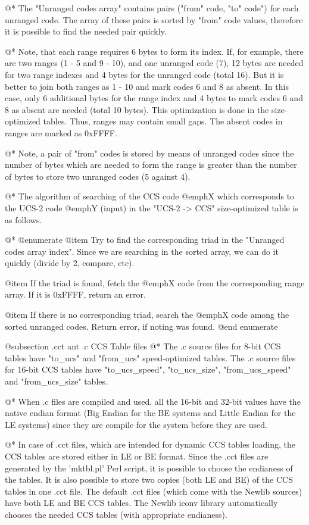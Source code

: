 @*
The "Unranged codes array" contains pairs ("from" code, "to" code") for
each unranged code. The array of these pairs is sorted by "from" code
values, therefore it is possible to find the needed pair quickly.

@*
Note, that each range requires 6 bytes to form its index. If, for
example, there are two ranges (1 - 5 and 9 - 10), and one unranged code
(7), 12 bytes are needed for two range indexes and 4 bytes for the unranged
code (total 16). But it is better to join both ranges as 1 - 10 and
mark codes 6 and 8 as absent. In this case, only 6 additional bytes for the
range index and 4 bytes to mark codes 6 and 8 as absent are needed
(total 10 bytes). This optimization is done in the size-optimized tables.
Thus, ranges may contain small gaps. The absent codes in ranges are marked
as 0xFFFF.

@*
Note, a pair of "from" codes is stored by means of unranged codes since
the number of bytes which are needed to form the range is greater than
the number of bytes to store two unranged codes (5 against 4).

@*
The algorithm of searching of the CCS code
@emph{X} which corresponds to the UCS-2 code @emph{Y} (input) in the "UCS-2 ->
CCS" size-optimized table is as follows.

@*
@enumerate
@item Try to find the corresponding triad in the "Unranged codes array
index". Since we are searching in the sorted array, we can do it quickly
(divide by 2, compare, etc).

@item If the triad is found, fetch the @emph{X} code from the corresponding
range array. If it is 0xFFFF, return an error.

@item If there is no corresponding triad, search the @emph{X} code among the
sorted unranged codes. Return error, if noting was found.
@end enumerate

@subsection .cct ant .c CCS Table files
@*
The .c source files for 8-bit CCS tables have "to_ucs" and "from_ucs"
speed-optimized tables. The .c source files for 16-bit CCS tables have
"to_ucs_speed", "to_ucs_size", "from_ucs_speed" and "from_ucs_size"
tables.

@*
When .c files are compiled and used, all the 16-bit and 32-bit values
have the native endian format (Big Endian for the BE systems and Little
Endian for the LE systems) since they are compile for the system before
they are used.

@*
In case of .cct files, which are intended for dynamic CCS tables
loading, the CCS tables are stored either in LE or BE format. Since the
.cct files are generated by the 'mktbl.pl' Perl script, it is possible
to choose the endianess of the tables. It is also possible to store two
copies (both LE and BE) of the CCS tables in one .cct file. The default
.cct files (which come with the Newlib sources) have both LE and BE CCS
tables. The Newlib iconv library automatically chooses the needed CCS tables
(with appropriate endianess).

